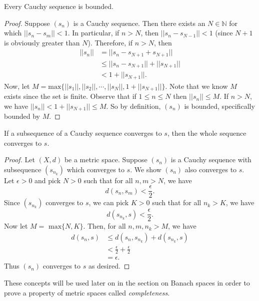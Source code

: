 \begin{theorem}
Every Cauchy sequence is bounded.
\end{theorem}

\begin{proof}
Suppose $(s_n)$ is a Cauchy sequence.  Then there exists an $N \in \mathbb{N}$ for which $||s_n - s_m|| < 1$.  In particular, if $n>N$, then $||s_n - s_{N-1}|| < 1$ (since $N+1$ is obviously greater than $N$).  Therefore, if $n>N$, then
\begin{align*}
||s_n|| &= ||s_n - s_{N+1} + s_{N+1}||\\
&\leq ||s_n - s_{N+1}|| + ||s_{N+1}||\\
&< 1 + ||s_{N+1}||.
\end{align*}
Now, let $M = \textrm{max}\{||s_1||, ||s_2||, \cdots, ||s_N||, 1 + ||s_{N+1}||\}.$  Note that we know $M$ exists since the set is finite.  Observe that if $1 \leq n \leq N$ then $||s_n|| \leq M$.  If $n > N$, we have $||s_n|| < 1 + ||s_{N+1}|| \leq M$.  So by definition, $(s_n)$ is bounded, specifically bounded by $M$.
\end{proof}

\begin{theorem}
If a subsequence of a Cauchy sequence converges to $s$, then the whole sequence converges to $s$.
\end{theorem}

\begin{proof}
Let $(X,d)$ be a metric space.  Suppose $(s_n)$ is a Cauchy sequence with subsequence $(s_{n_k})$ which converges to $s$.  We show $(s_n)$ also converges to $s$.  Let $\epsilon > 0$ and pick $N > 0$ such that for all $n,m > N$, we have
\[d(s_n, s_m) < \frac{\epsilon}{2}.\]
Since $(s_{n_k})$ converges to $s$, we can pick $K > 0$ such that for all $n_k > K$, we have
\[d(s_{n_k},s) < \frac{\epsilon}{2}.\]
Now let $M = \textrm{ max}\{N,K\}$.  Then, for all $n, m, n_k > M$, we have
\begin{align*}
d(s_n,s) &\leq d(s_n, s_{n_k}) + d(s_{n_k}, s)\\
&< \frac{\epsilon}{2} + \frac{\epsilon}{2}\\
&= \epsilon.
\end{align*}
Thus $(s_n)$ converges to $s$ as desired.
\end{proof}

These concepts will be used later on in the section on Banach spaces in order to prove a property of metric spaces called \textit{completeness}.